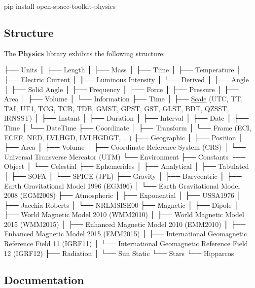 \begin{DoxyCode}
pip install open-space-toolkit-physics
\end{DoxyCode}


\subsection*{Structure}

The {\bfseries Physics} library exhibits the following structure\+:


\begin{DoxyCode}
├── Units
│   ├── Length
│   ├── Mass
│   ├── Time
│   ├── Temperature
│   ├── Electric Current
│   ├── Luminous Intensity
│   └── Derived
│       ├── Angle
│       ├── Solid Angle
│       ├── Frequency
│       ├── Force
│       ├── Pressure
│       ├── Area
│       ├── Volume
│       └── Information
├── Time
│   ├── \hyperlink{namespaceostk_1_1physics_1_1time_adf23d37bd8641fb76a0e98ab46a70df7}{Scale} (UTC, TT, TAI, UT1, TCG, TCB, TDB, GMST, GPST, GST, GLST, BDT, QZSST, IRNSST)
│   ├── Instant
│   ├── Duration
│   ├── Interval
│   ├── Date
│   ├── Time
│   └── DateTime
├── Coordinate
│   ├── Transform
│   └── Frame (ECI, ECEF, NED, LVLHGD, LVLHGDGT, ...)
├── Geographic
│   ├── Position
│   ├── Area
│   ├── Volume
│   ├── Coordinate Reference System (CRS)
│   └── Universal Transverse Mercator (UTM)
└── Environment
    ├── Constants
    ├── Object
    │   └── Celestial
    ├── Ephemerides
    │   ├── Analytical
    │   ├── Tabulated
    │   ├── SOFA
    │   └── SPICE (JPL)
    ├── Gravity
    │   ├── Barycentric
    │   ├── Earth Gravitational Model 1996 (EGM96)
    │   └── Earth Gravitational Model 2008 (EGM2008)
    ├── Atmospheric
    │   ├── Exponential
    │   ├── USSA1976
    │   ├── Jacchia Roberts
    │   └── NRLMSISE00
    ├── Magnetic
    │   ├── Dipole
    │   ├── World Magnetic Model 2010 (WMM2010)
    │   ├── World Magnetic Model 2015 (WMM2015)
    │   ├── Enhanced Magnetic Model 2010 (EMM2010)
    │   ├── Enhanced Magnetic Model 2015 (EMM2015)
    │   ├── International Geomagnetic Reference Field 11 (IGRF11)
    │   └── International Geomagnetic Reference Field 12 (IGRF12)
    ├── Radiation
    │   └── Sun Static
    └── Stars
        └── Hipparcos
\end{DoxyCode}


\subsection*{Documentation}

